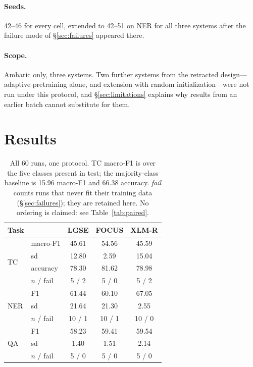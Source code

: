 \documentclass[11pt]{article}
\begin{document}
\paragraph{Seeds.} 42--46 for every cell, extended to 42--51 on NER for all
three systems after the failure mode of \S\ref{sec:failures} appeared there.

\paragraph{Scope.} Amharic only, three systems. Two further systems from the
retracted design---adaptive pretraining alone, and extension with random
initialization---were not run under this protocol, and
\S\ref{sec:limitations} explains why results from an earlier batch cannot
substitute for them.

\section{Results}
\label{sec:results}

\begin{table}[t]
\centering
\small
\begin{tabular}{llccc}
\toprule
Task & & LGSE & FOCUS & XLM-R \\
\midrule
\multirow{4}{*}{TC}
 & macro-F1 & 45.61 & 54.56 & 45.59 \\
 & sd       & 12.80 & 2.59  & 15.04 \\
 & accuracy & 78.30 & 81.62 & 78.98 \\
 & $n$ / fail & 5 / 2 & 5 / 0 & 5 / 2 \\
\midrule
\multirow{3}{*}{NER}
 & F1  & 61.44 & 60.10 & 67.05 \\
 & sd  & 21.64 & 21.30 & 2.55 \\
 & $n$ / fail & 10 / 1 & 10 / 1 & 10 / 0 \\
\midrule
\multirow{3}{*}{QA}
 & F1  & 58.23 & 59.41 & 59.54 \\
 & sd  & 1.40  & 1.51  & 2.14 \\
 & $n$ / fail & 5 / 0 & 5 / 0 & 5 / 0 \\
\bottomrule
\end{tabular}
\caption{All 60 runs, one protocol. TC macro-F1 is over the five classes
present in test; the majority-class baseline is 15.96 macro-F1 and 66.38
accuracy. \emph{fail} counts runs that never fit their training data
(\S\ref{sec:failures}); they are retained here. No ordering is claimed:
see Table~\ref{tab:paired}.}
\label{tab:main}
\end{table}
\end{document}

